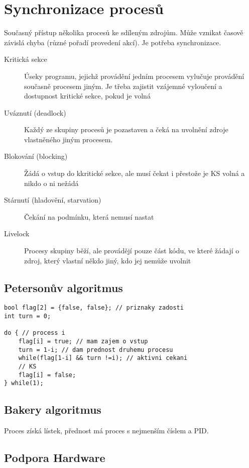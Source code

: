 \documentclass[a4paper, 11pt]{report}
\begin{document}
\section{Synchronizace procesů}

Současný přístup několika procesů ke sdíleným zdrojům. Může vznikat časově závislá chyba (různé pořadí provedení akcí). Je potřeba synchronizace.

\begin{description}
	\item[Kritická sekce] Úseky programu, jejichž provádění jedním procesem vylučuje provádění současně procesem jiným. Je třeba zajistit vzájemné vyloučení a dostupnost kritické sekce, pokud je volná
	\item[Uváznutí (deadlock)] Každý ze skupiny procesů je pozastaven a čeká na uvolnění zdroje vlastněného jiným procesem.
	\item[Blokování (blocking)] Žádá o vstup do kkritické sekce, ale musí čekat i přestože je KS volná a nikdo o ni nežádá
	\item[Stárnutí (hladovění, starvation)] Čekání na podmínku, která nemusí nastat
	\item[Livelock] Procesy skupiny běží, ale provádějí pouze část kódu, ve které žádají o zdroj, který vlastní někdo jiný, kdo jej nemůže uvolnit
\end{description}

\subsection{Petersonův algoritmus}

\begin{lstlisting}
bool flag[2] = {false, false}; // priznaky zadosti
int turn = 0;

do { // process i
	flag[i] = true; // mam zajem o vstup
	turn = 1-i; // dam prednost druhemu procesu
	while(flag[1-i] && turn !=i); // aktivni cekani
	// KS
	flag[i] = false;
} while(1);
\end{lstlisting}

\subsection{Bakery algoritmus}

Proces získá lístek, přednost má proces s nejmenším číslem a PID.

\subsection{Podpora Hardware}
\end{document}

